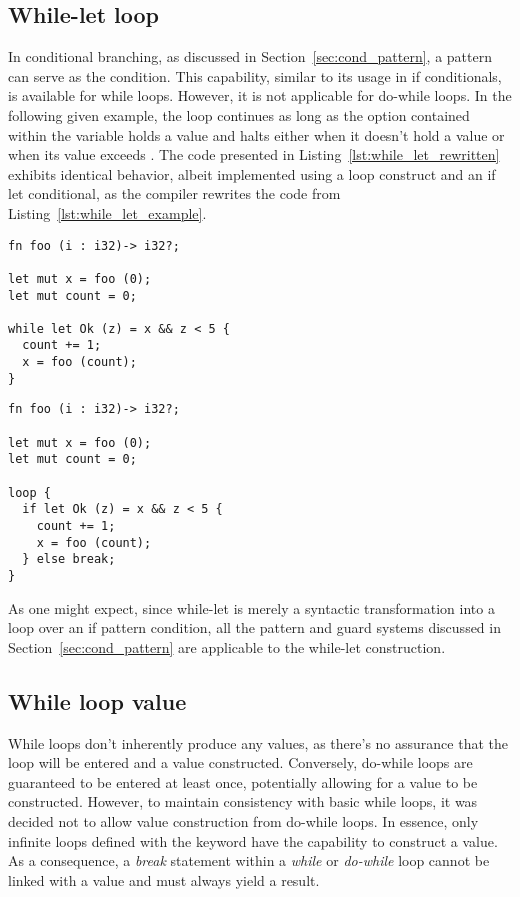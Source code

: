 \subsection{While-let loop}
\label{sec:while_let_loop}

In conditional branching, as discussed in Section~\ref{sec:cond_pattern}, a
pattern can serve as the condition. This capability, similar to its usage in if
conditionals, is available for while loops. However, it is not applicable for
do-while loops. In the following given example, the loop continues as long as
the option contained within the variable  holds a value and halts
either when it doesn't hold a value or when its value exceeds . The
code presented in Listing~\ref{lst:while_let_rewritten} exhibits identical
behavior, albeit implemented using a loop construct and an if let conditional,
as the compiler rewrites the code from Listing~\ref{lst:while_let_example}.

\begin{lstlisting}[style=coloredverbatim, caption=While-let example, label=lst:while_let_example]
fn foo (i : i32)-> i32?;

let mut x = foo (0);
let mut count = 0;

while let Ok (z) = x && z < 5 {
  count += 1;
  x = foo (count);
}
\end{lstlisting}

\begin{lstlisting}[style=coloredverbatim, caption=While-let rewritten using loop and if-let, label=lst:while_let_rewritten]
fn foo (i : i32)-> i32?;

let mut x = foo (0);
let mut count = 0;

loop {
  if let Ok (z) = x && z < 5 {
    count += 1;
    x = foo (count);
  } else break;
}
\end{lstlisting}

As one might expect, since while-let is merely a syntactic transformation into a
loop over an if pattern condition, all the pattern and guard systems discussed
in Section~\ref{sec:cond_pattern} are applicable to the while-let construction.

\subsection{While loop value}

While loops don't inherently produce any values, as there's no assurance that
the loop will be entered and a value constructed. Conversely, do-while loops are
guaranteed to be entered at least once, potentially allowing for a value to be
constructed. However, to maintain consistency with basic while loops, it was
decided not to allow value construction from do-while loops. In essence, only
infinite loops defined with the  keyword have the capability to
construct a value. As a consequence, a \textit{break} statement within a
\textit{while} or \textit{do-while} loop cannot be linked with a value and must
always yield a  result.

